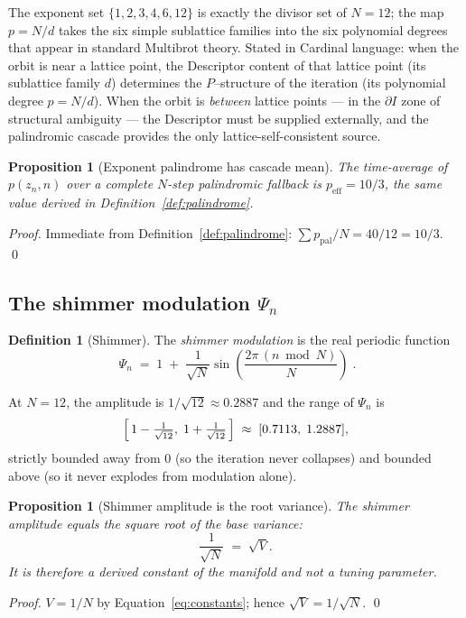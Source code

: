 \documentclass[11pt,a4paper]{article}
\newtheorem{proposition}[theorem]{Proposition}
\theoremstyle{definition}
\newtheorem{definition}[theorem]{Definition}
\theoremstyle{remark}
\begin{document}
The exponent set $\{1,2,3,4,6,12\}$ is exactly the divisor set of $N=12$; the map $p = N/d$ takes the six simple sublattice families into the six polynomial degrees that appear in standard Multibrot theory. Stated in Cardinal language: when the orbit is near a lattice point, the Descriptor content of that lattice point (its sublattice family $d$) determines the $P$--structure of the iteration (its polynomial degree $p = N/d$). When the orbit is \emph{between} lattice points --- in the $\partial I$ zone of structural ambiguity --- the Descriptor must be supplied externally, and the palindromic cascade provides the only lattice-self-consistent source.

\begin{proposition}[Exponent palindrome has cascade mean]\label{prop:dI-peff}
The time-average of $p(z_{n},n)$ over a complete $N$-step palindromic fallback is $p_{\mathrm{eff}}=10/3$, the same value derived in Definition~\ref{def:palindrome}.
\end{proposition}
\begin{proof}
Immediate from Definition~\ref{def:palindrome}: $\sum p_{\mathrm{pal}}/N = 40/12 = 10/3$. \qed
\end{proof}

\subsection{The shimmer modulation $\Psi_{n}$}\label{subsec:dI-shimmer}

\begin{definition}[Shimmer]\label{def:shimmer}
The \emph{shimmer modulation} is the real periodic function
\[
\boxed{\;\Psi_{n} \;=\; 1 \;+\; \frac{1}{\sqrt{N}}\sin\!\left(\frac{2\pi\,(n\bmod N)}{N}\right)\;.}
\]
\end{definition}

At $N=12$, the amplitude is $1/\sqrt{12}\approx 0.2887$ and the range of $\Psi_{n}$ is
\[
\Bigl[\,1-\tfrac{1}{\sqrt{12}},\;1+\tfrac{1}{\sqrt{12}}\,\Bigr]\;\approx\;[0.7113,\;1.2887],
\]
strictly bounded away from $0$ (so the iteration never collapses) and bounded above (so it never explodes from modulation alone).

\begin{proposition}[Shimmer amplitude is the root variance]\label{prop:shimmer-V}
The shimmer amplitude equals the square root of the base variance:
\[
\frac{1}{\sqrt{N}} \;=\; \sqrt{V}.
\]
It is therefore a derived constant of the manifold and not a tuning parameter.
\end{proposition}
\begin{proof}
$V = 1/N$ by Equation~\eqref{eq:constants}; hence $\sqrt{V} = 1/\sqrt{N}$. \qed
\end{proof}
\end{document}
